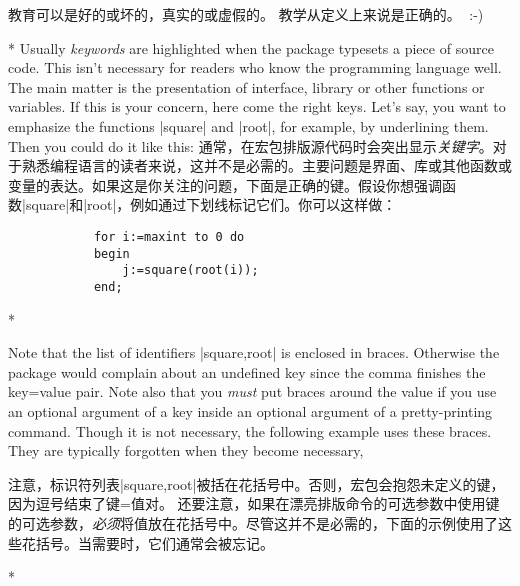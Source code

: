 \begin{paracol}{2}
\begin{advise}
教育可以是好的或坏的，真实的或虚假的。
教学从定义上来说是正确的。^^A :-)
\end{advise}
 \switchcolumn[0]*%
 Usually \emph{keywords} are highlighted when the package typesets a piece of
 source code. This isn't necessary for readers who know the programming
 language well. The main matter is the presentation of interface, library or
 other functions or variables. If this is your concern, here come the right
 keys. Let's say, you want to emphasize the functions |square| and |root|,
 for example, by underlining them. Then you could do it like this:
 \switchcolumn
 通常，在宏包排版源代码时会突出显示\emph{关键字}。对于熟悉编程语言的读者来说，这并不是必需的。主要问题是界面、库或其他函数或变量的表达。如果这是你关注的问题，下面是正确的键。假设你想强调函数|square|和|root|，例如通过下划线标记它们。你可以这样做：
 \begin{lstxsample}
 \end{lstxsample}
 \begin{lstsample}{}{}
            \begin{lstlisting}
            for i:=maxint to 0 do
            begin
                j:=square(root(i));
            end;
            \end{lstlisting}
 \end{lstsample}
\switchcolumn[0]*%
 \begin{advise}
 \item Note that the list of identifiers |{square,root}| is enclosed in
       braces. Otherwise the  package would complain
       about an undefined key  since the comma finishes the
       key=value pair.
       Note also that you \emph{must} put braces around the value if you
       use an optional argument of a key inside an optional argument of a
       pretty-printing command. Though it is not necessary, the following
       example uses these braces. They are typically forgotten when they
       become necessary,
 \end{advise}
 \switchcolumn
 \begin{advise}
    \item 注意，标识符列表|{square,root}|被括在花括号中。否则，宏包会抱怨未定义的键，因为逗号结束了键=值对。
    还要注意，如果在漂亮排版命令的可选参数中使用键的可选参数，\emph{必须}将值放在花括号中。尽管这并不是必需的，下面的示例使用了这些花括号。当需要时，它们通常会被忘记。
    \end{advise}
\switchcolumn[0]*%


\end{paracol}
